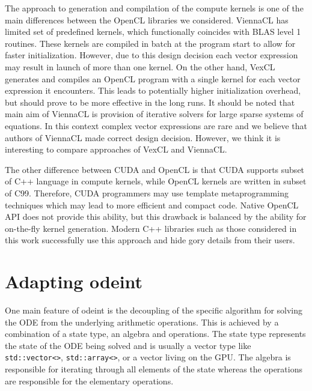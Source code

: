 \documentclass[1p]{elsarticle}
\newcommand{\code}[1]{\lstinline|#1|}
\begin{document}
The approach to generation and compilation of the compute kernels is one of the
main differences between the OpenCL libraries we considered.  ViennaCL has
limited set of predefined kernels, which functionally coincides with BLAS level
1 routines.  These kernels are compiled in batch at the program start to allow
for faster initialization. However, due to this design decision each vector
expression may result in launch of more than one kernel.  On the other hand,
VexCL generates and compiles an OpenCL program with a single kernel for each
vector expression it encounters.  This leads to potentially higher
initialization overhead, but should prove to be more effective in the long
runs. It should be noted that main aim of ViennaCL is provision of iterative
solvers for large sparse systems of equations. In this context complex vector
expressions are rare and we believe that authors of ViennaCL made correct
design decision.  However, we think it is interesting to compare approaches of
VexCL and ViennaCL.

The other difference between CUDA and OpenCL is that CUDA supports subset of
C++ language in compute kernels, while OpenCL kernels are written in subset of
C99. Therefore, CUDA programmers may use template metaprogramming techniques
which may lead to more efficient and compact code.  Native OpenCL API does not
provide this ability, but this drawback is balanced by the ability for
on-the-fly kernel generation. Modern C++ libraries such as those considered in
this work successfully use this approach and hide gory details from their
users.




%
%
\section{Adapting odeint}

One main feature of odeint is the decoupling of the specific algorithm
for solving the ODE from the underlying arithmetic operations. This
is achieved by a combination of a state type, an algebra and
operations. The state type represents the state of the ODE being
solved and is usually a vector type like \code{std::vector<>},
\code{std::array<>}, or a vector living on the GPU. The algebra is
responsible for iterating through all elements of the state whereas
the operations are responsible for the elementary operations.
\end{document}
